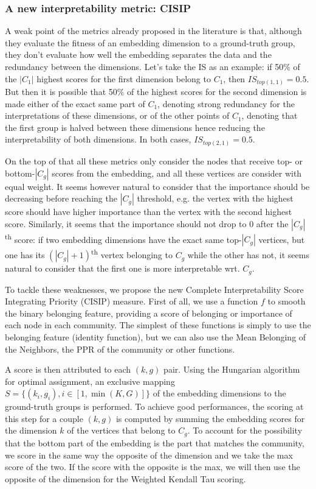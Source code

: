 \subsubsection{A new interpretability metric: CISIP}

A weak point of the metrics already proposed in the literature is that, although they evaluate the fitness of an embedding dimension to a ground-truth group, they don't evaluate how well the embedding separates the data and the redundancy between the dimensions. Let's take the IS as an example: if 50\% of the $|C_1|$ highest scores for the first dimension belong to $C_1$, then $IS_{top(1,1)} = 0.5$. But then it is possible that 50\% of the highest scores for the second dimension is made either of the exact same part of $C_1$, denoting strong redundancy for the interpretations of these dimensions, or of the other points of $C_1$, denoting that the first group is halved between these dimensions hence reducing the interpretability of both dimensions. In both cases, $IS_{top(2, 1)} = 0.5$.

On the top of that all these metrics only consider the nodes that receive top- or bottom-$|C_g|$ scores from the embedding, and all these vertices are consider with equal weight. It seems however natural to consider that the importance should be decreasing before reaching the $|C_g|$ threshold, e.g. the vertex with the highest score should have higher importance than the vertex with the second highest score. Similarly, it seems that the importance should not drop to 0 after the $|C_g|$\textsuperscript{th} score: if two embedding dimensions have the exact same top-$|C_g|$ vertices, but one has its $(|C_g|+1)$\textsuperscript{th} vertex belonging to $C_g$ while the other has not, it seems natural to consider that the first one is more interpretable wrt. $C_g$. 

To tackle these weaknesses, we propose the new Complete Interpretability Score Integrating Priority (CISIP) measure. First of all, we use a function $f$ to smooth the binary belonging feature, providing a score of belonging or importance of each node in each community. The simplest of these functions is simply to use the belonging feature (identity function), but we can also use the Mean Belonging of the Neighbors, the PPR of the community or other functions.

A score is then attributed to each $(k, g)$ pair. Using the Hungarian algorithm for optimal assignment, an exclusive mapping $S = \{(k_i, g_i), i \in [1, \min(K, G)]\}$ of the embedding dimensions to the ground-truth groups is performed. To achieve good performances, the scoring at this step for a couple $(k, g)$ is computed by summing the embedding scores for the dimension $k$ of the vertices that belong to $C_g$. To account for the possibility that the bottom part of the embedding is the part that matches the community, we score in the same way the opposite of the dimension and we take the max score of the two. If the score with the opposite is the max, we will then use the opposite of the dimension for the Weighted Kendall Tau scoring.

